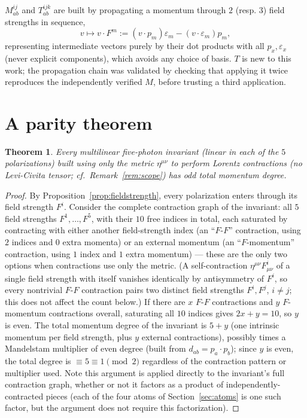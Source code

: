 \documentclass[reqno]{amsart}
\newtheorem{theorem}{Theorem}[section]
\begin{document}
$M^{ij}_{ab}$ and $T^{ijk}_{ab}$ are built by propagating a momentum through $2$ (resp. $3$) field
strengths in sequence,
\[
v \mapsto v\cdot F^m := (v\cdot p_m)\varepsilon_m - (v\cdot\varepsilon_m)p_m,
\]
representing intermediate vectors purely by their dot products with all $p_x,\varepsilon_x$
(never explicit components), which avoids any choice of basis. $T$ is new to this work; the
propagation chain was validated by checking that applying it twice reproduces the independently
verified $M$, before trusting a third application.

\section{A parity theorem}
\label{sec:parity}

\begin{theorem}
\label{thm:parity}
Every multilinear five-photon invariant (linear in each of the $5$ polarizations) built using only
the metric $\eta^{\mu\nu}$ to perform Lorentz contractions (no Levi-Civita tensor; cf.\
Remark~\ref{rem:scope}) has odd total momentum degree.
\end{theorem}

\begin{proof}
By Proposition~\ref{prop:fieldstrength}, every polarization enters through its field strength
$F^i$. Consider the complete contraction graph of the invariant: all $5$ field strengths
$F^1,\dots,F^5$, with their $10$ free indices in total, each saturated by contracting with either
another field-strength index (an ``$F$-$F$'' contraction, using $2$ indices and $0$ extra momenta)
or an external momentum (an ``$F$-momentum'' contraction, using $1$ index and $1$ extra momentum)
--- these are the only two options when contractions use only the metric. (A self-contraction
$\eta^{\mu\nu}F^i_{\mu\nu}$ of a single field strength with itself vanishes identically by
antisymmetry of $F^i$, so every nontrivial $F$-$F$ contraction pairs two distinct field strengths
$F^i,F^j$, $i\neq j$; this does not affect the count below.) If there are $x$ $F$-$F$ contractions
and $y$ $F$-momentum contractions overall, saturating all $10$ indices gives $2x+y=10$, so $y$ is
even. The total momentum degree of the invariant is $5+y$ (one intrinsic momentum per field
strength, plus $y$ external contractions), possibly times a Mandelstam multiplier of even degree
(built from $d_{ab}=p_a\cdot p_b$); since $y$ is even, the total degree is
$\equiv5\equiv1\pmod2$ regardless of the contraction pattern or multiplier used. Note this argument
is applied directly to the invariant's full contraction graph, whether or not it factors as a
product of independently-contracted pieces (each of the four atoms of Section~\ref{sec:atoms} is
one such factor, but the argument does not require this factorization).
\end{proof}
\end{document}
